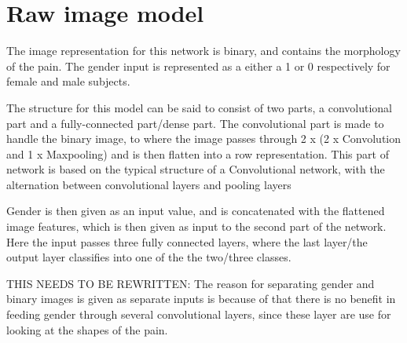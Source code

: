 \section{Raw image model}
The image representation for this network is binary, and contains the morphology of the pain. The gender input is represented as a either a 1 or 0 respectively for female and male subjects. 

The structure for this model can be said to consist of two parts, a convolutional part and a fully-connected part/dense part. The convolutional part is made to handle the binary image, to where the image passes through 2 x (2 x Convolution and 1 x Maxpooling) and is then flatten into a row representation. 
This part of network is based on the typical structure of a Convolutional network, with the alternation between convolutional layers and pooling layers \citep{LeCun2015}

Gender is then given as an input value, and is concatenated with the flattened image features, which is then given as input to the second part of the network. Here the input passes three fully connected layers, where the last layer/the output layer classifies into one of the the two/three classes.

THIS NEEDS TO BE REWRITTEN: The reason for separating gender and binary images is given as separate inputs is because of that there is no benefit in feeding gender through several convolutional layers, since these layer are use for looking at the shapes of the pain.  
